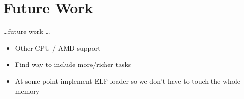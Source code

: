 \chapter{Future Work}
\label{sec:futurework}

\ldots future work \ldots

\begin{itemize}
    \item Other CPU / AMD support
    \item Find way to include more/richer tasks
    \item At some point implement ELF loader so we don't have to touch the whole memory
\end{itemize}
\cleardoublepage

